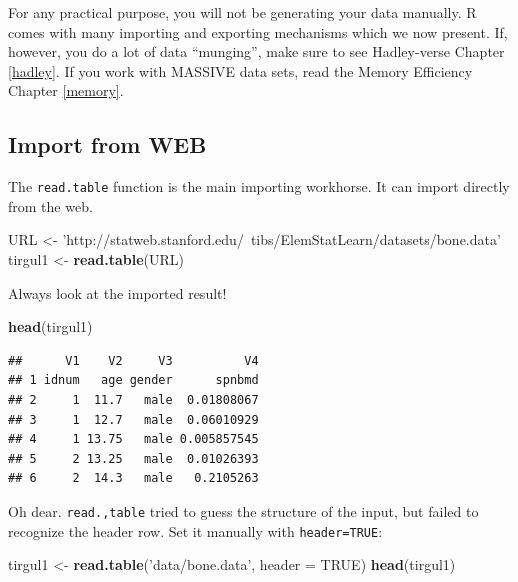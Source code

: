 \documentclass[]{book}
\newenvironment{Shaded}{\begin{snugshade}}{\end{snugshade}}
\newcommand{\DataTypeTok}[1]{\textcolor[rgb]{0.13,0.29,0.53}{#1}}
\newcommand{\KeywordTok}[1]{\textcolor[rgb]{0.13,0.29,0.53}{\textbf{#1}}}
\newcommand{\NormalTok}[1]{#1}
\newcommand{\OtherTok}[1]{\textcolor[rgb]{0.56,0.35,0.01}{#1}}
\newcommand{\StringTok}[1]{\textcolor[rgb]{0.31,0.60,0.02}{#1}}
\theoremstyle{definition}
\theoremstyle{definition}
\theoremstyle{definition}
\theoremstyle{remark}
\begin{document}
For any practical purpose, you will not be generating your data manually.
R comes with many importing and exporting mechanisms which we now present.
If, however, you do a lot of data ``munging'', make sure to see Hadley-verse Chapter \ref{hadley}.
If you work with MASSIVE data sets, read the Memory Efficiency Chapter \ref{memory}.

\hypertarget{import-from-web}{%
\subsection{Import from WEB}\label{import-from-web}}

The \texttt{read.table} function is the main importing workhorse.
It can import directly from the web.

\begin{Shaded}
\begin{Highlighting}[]
\NormalTok{URL <-}\StringTok{ 'http://statweb.stanford.edu/~tibs/ElemStatLearn/datasets/bone.data'}
\NormalTok{tirgul1 <-}\StringTok{ }\KeywordTok{read.table}\NormalTok{(URL)}
\end{Highlighting}
\end{Shaded}

Always look at the imported result!

\begin{Shaded}
\begin{Highlighting}[]
\KeywordTok{head}\NormalTok{(tirgul1)}
\end{Highlighting}
\end{Shaded}

\begin{verbatim}
##      V1    V2     V3          V4
## 1 idnum   age gender      spnbmd
## 2     1  11.7   male  0.01808067
## 3     1  12.7   male  0.06010929
## 4     1 13.75   male 0.005857545
## 5     2 13.25   male  0.01026393
## 6     2  14.3   male   0.2105263
\end{verbatim}

Oh dear.
\texttt{read.,table} tried to guess the structure of the input, but failed to recognize the header row. Set it manually with \texttt{header=TRUE}:

\begin{Shaded}
\begin{Highlighting}[]
\NormalTok{tirgul1 <-}\StringTok{ }\KeywordTok{read.table}\NormalTok{(}\StringTok{'data/bone.data'}\NormalTok{, }\DataTypeTok{header =} \OtherTok{TRUE}\NormalTok{) }
\KeywordTok{head}\NormalTok{(tirgul1)}
\end{Highlighting}
\end{Shaded}
\end{document}
